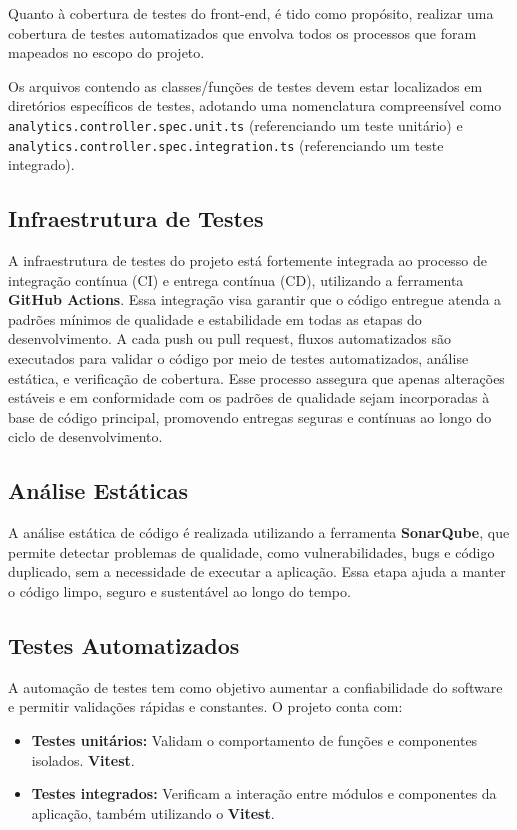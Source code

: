 Quanto à cobertura de testes do front-end, é tido como propósito, realizar uma cobertura de testes automatizados que envolva todos os processos que foram mapeados no escopo do projeto.

Os arquivos contendo as classes/funções de testes devem estar localizados em diretórios específicos 
de testes, adotando uma nomenclatura compreensível como 
\texttt{analytics.\allowbreak controller.\allowbreak spec.\allowbreak unit.ts} (referenciando um teste unitário) e 
\texttt{analytics.\allowbreak controller.\allowbreak spec.\allowbreak integration.ts} (referenciando um teste integrado).

\subsection{Infraestrutura de Testes}

A infraestrutura de testes do projeto está fortemente integrada ao processo de integração contínua (CI) e entrega contínua (CD),
utilizando a ferramenta \textbf{GitHub Actions}. Essa integração visa garantir que o código entregue atenda a padrões mínimos de qualidade e estabilidade 
em todas as etapas do desenvolvimento.  A cada push ou pull request, fluxos automatizados são executados para validar o código por meio de testes automatizados, 
análise estática, e verificação de cobertura. Esse processo assegura que apenas alterações estáveis e em conformidade com os 
padrões de qualidade sejam incorporadas à base de código principal, promovendo entregas seguras e contínuas ao longo do ciclo de desenvolvimento.

\subsection{Análise Estáticas}
A análise estática de código é realizada utilizando a ferramenta \textbf{SonarQube}, 
que permite detectar problemas de qualidade, como vulnerabilidades, bugs e código duplicado, sem a necessidade de executar a aplicação. 
Essa etapa ajuda a manter o código limpo, seguro e sustentável ao longo do tempo.

\subsection{Testes Automatizados}
A automação de testes tem como objetivo aumentar a confiabilidade do software e permitir validações rápidas e constantes. O projeto conta com:

\begin{itemize}
  \item \textbf{Testes unitários:} Validam o comportamento de funções e componentes isolados. \textbf{Vitest}.
  \item \textbf{Testes integrados:} Verificam a interação entre módulos e componentes da aplicação, também utilizando o \textbf{Vitest}.
\end{itemize}

